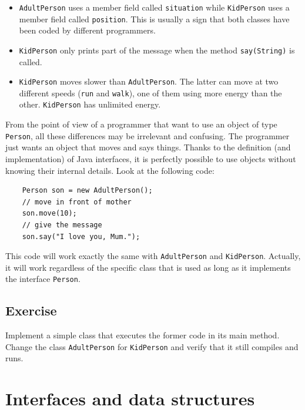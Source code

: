 \begin{itemize}
\item \verb+AdultPerson+ uses a member field called \verb+situation+
  while \verb+KidPerson+ uses a member field called
  \verb+position+. This is usually a sign that both classes have been
  coded by different programmers.
\item \verb+KidPerson+ only prints part of the message when the method
  \verb+say(String)+ is called.
\item \verb+KidPerson+ moves slower than \verb+AdultPerson+. The
  latter can move at two different speeds (\verb+run+ and
  \verb+walk+), one of them using more 
  energy than the other. \verb+KidPerson+ has unlimited energy. 
\end{itemize}

From the point of view of a programmer that want to use an object of
type \verb+Person+, all these differences may be irrelevant and
confusing. The programmer just wants an object that moves and says
things. Thanks to the definition (and implementation) 
of Java interfaces, it is perfectly possible to use
objects without knowing their internal details.
Look at the following code: 

\begin{verbatim}
    Person son = new AdultPerson();
    // move in front of mother
    son.move(10);
    // give the message
    son.say("I love you, Mum.");
\end{verbatim}

This code will work exactly the same with \verb+AdultPerson+ and
\verb+KidPerson+. Actually, it will work regardless of the specific class
that is used as long as it
implements the interface \verb+Person+. 

\subsection*{Exercise}
\label{sec:exercise}

Implement a simple class that executes the former code in its main
method. Change the class \verb+AdultPerson+ for \verb+KidPerson+ and
verify that it still compiles and runs. 

\section{Interfaces and data structures}
\label{sec:interfaces-lists}

